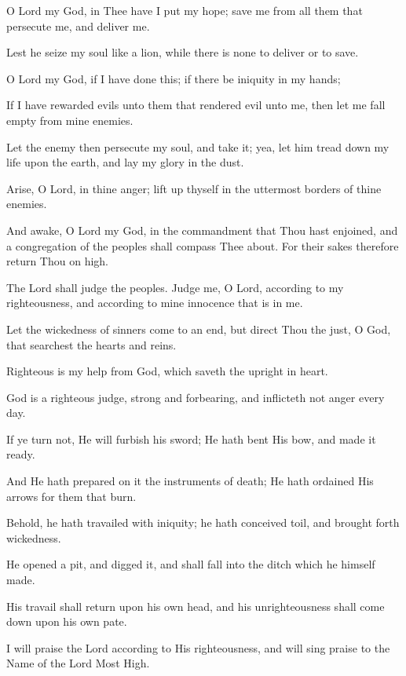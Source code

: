 O Lord my God, in Thee have I put my hope; save me from all them that persecute me, and deliver me.

Lest he seize my soul like a lion, while there is none to deliver or to save.

O Lord my God, if I have done this; if there be iniquity in my hands;

If I have rewarded evils unto them that rendered evil unto me, then let me fall empty from mine enemies.

Let the enemy then persecute my soul, and take it; yea, let him tread down my life upon the earth, and lay my glory in the dust.

Arise, O Lord, in thine anger; lift up thyself in the uttermost borders of thine enemies.

And awake, O Lord my God, in the commandment that Thou hast enjoined, and a congregation of the peoples shall compass Thee about. For their sakes therefore return Thou on high.

The Lord shall judge the peoples. Judge me, O Lord, according to my righteousness, and according to mine innocence that is in me.

Let the wickedness of sinners come to an end, but direct Thou the just, O God, that searchest the hearts and reins.

Righteous is my help from God, which saveth the upright in heart.

God is a righteous judge, strong and forbearing, and inflicteth not anger every day.

If ye turn not, He will furbish his sword; He hath bent His bow, and made it ready.

And He hath prepared on it the instruments of death; He hath ordained His arrows for them that burn.

Behold, he hath travailed with iniquity; he hath conceived toil, and brought forth wickedness.

He opened a pit, and digged it, and shall fall into the ditch which he himself made.

His travail shall return upon his own head, and his unrighteousness shall come down upon his own pate.

I will praise the Lord according to His righteousness, and will sing praise to the Name of the Lord Most High.
